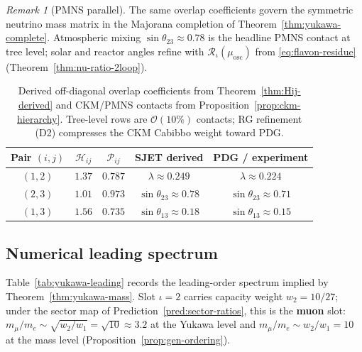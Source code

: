 \documentclass[11pt]{article}
\theoremstyle{plain}
\theoremstyle{definition}
\theoremstyle{remark}
\newtheorem{remark}[theorem]{Remark}
\numberwithin{equation}{section}
\begin{document}
\begin{remark}[PMNS parallel]
The same overlap coefficients govern the symmetric neutrino mass matrix in the
Majorana completion of Theorem~\ref{thm:yukawa-complete}. Atmospheric mixing
$\sin\theta_{23}\approx 0.78$ is the headline PMNS contact at tree level;
solar and reactor angles refine with $\mathcal{R}_\iota(\mu_{\mathrm{osc}})$
from \eqref{eq:flavon-residue} (Theorem~\ref{thm:nu-ratio-2loop}).
\end{remark}

\begin{table}[ht]
\centering
\small
\renewcommand{\arraystretch}{1.12}
\begin{tabular}{@{}ccccc@{}}
\toprule
\textbf{Pair $(i,j)$} & $\mathcal{H}_{ij}$ & $\mathcal{P}_{ij}$ &
SJET derived & PDG / experiment \\
\midrule
$(1,2)$ & $1.37$ & $0.787$ &
  $\lambda\approx 0.249$ &
  $\lambda\approx0.224$ \\
$(2,3)$ & $1.01$ & $0.973$ &
  $\sin\theta_{23}\approx 0.78$ &
  $\sin\theta_{23}\approx 0.71$ \\
$(1,3)$ & $1.56$ & $0.735$ &
  $\sin\theta_{13}\approx 0.18$ &
  $\sin\theta_{13}\approx 0.15$ \\
\bottomrule
\end{tabular}
\caption{Derived off-diagonal overlap coefficients from
Theorem~\ref{thm:Hij-derived} and CKM/PMNS contacts from
Proposition~\ref{prop:ckm-hierarchy}. Tree-level rows are
$\mathcal{O}(10\%)$ contacts; RG refinement (D2) compresses the CKM Cabibbo
weight toward PDG.}
\label{tab:Pij-ckm}
\end{table}

\subsection{Numerical leading spectrum}
\label{sec:yukawa:numerical}

Table~\ref{tab:yukawa-leading} records the leading-order spectrum implied by
Theorem~\ref{thm:yukawa-mass}. Slot $\iota=2$ carries capacity weight
$w_2=10/27$; under the sector map of Prediction~\ref{pred:sector-ratios},
this is the \textbf{muon} slot: $m_\mu/m_e\sim\sqrt{w_2/w_1}=\sqrt{10}\approx
3.2$ at the Yukawa level and $m_\mu/m_e\sim w_2/w_1=10$ at the mass level
(Proposition~\ref{prop:gen-ordering}).
\end{document}
